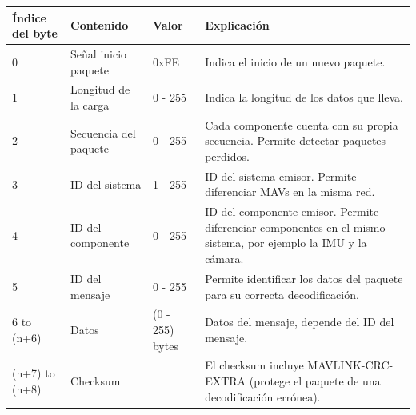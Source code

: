 \begin{center}
	\label{tablaMavLinkProtocolo}
    \begin{tabular}{ | p{2cm} | p{2cm} | p{3cm} | p{5cm} |}
    \hline
    Índice del byte & Contenido & Valor & Explicación \\ \hline
    0 & Señal inicio paquete & 0xFE  & Indica el inicio de un nuevo paquete. \\ \hline
     1 & Longitud de la carga	& 0 - 255 & Indica la longitud de los datos que lleva. \\ \hline
     2 & Secuencia del paquete & 0 - 255 & Cada componente cuenta con su propia secuencia. Permite detectar paquetes perdidos. \\
    \hline
    3 & ID del sistema & 1 - 255 & ID del sistema emisor. Permite diferenciar MAVs en la misma red. \\
    \hline
    4 & ID del componente & 0 - 255	& ID del componente emisor. Permite diferenciar componentes en el mismo sistema, por ejemplo la IMU y la cámara.\\
    \hline
    5 & ID del mensaje	& 0 - 255 & Permite identificar los datos del paquete para su correcta decodificación.\\
    \hline
     6 to (n+6)  & Datos	& (0 - 255) bytes & Datos del mensaje, depende del ID del mensaje.\\
    \hline
   	(n+7) to (n+8) & Checksum &  & El checksum  incluye MAVLINK-CRC-EXTRA (protege el paquete de una decodificación errónea). \\ 
    \hline
    \end{tabular}
\end{center}
\clearpage



